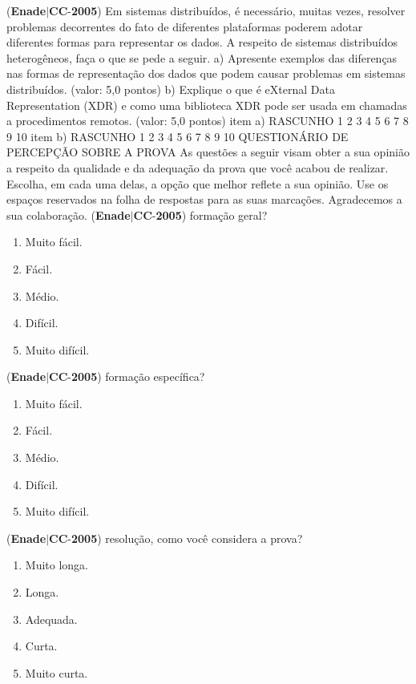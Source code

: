 \documentclass{exam}
\begin{document}
\begin{questions}
\begin{enumerate}[label=\alph*)]
	\end{enumerate}

\question (\textbf{Enade}$|$\textbf{CC}-\textbf{2005}) Em sistemas distribuídos, é necessário, muitas vezes, resolver problemas decorrentes do fato de diferentes plataformas
poderem adotar diferentes formas para representar os dados.
A respeito de sistemas distribuídos heterogêneos, faça o que se pede a seguir.
a) Apresente exemplos das diferenças nas formas de representação dos dados que podem causar problemas em sistemas distribuídos.
(valor: 5,0 pontos)
b) Explique o que é eXternal Data Representation (XDR) e como uma biblioteca XDR pode ser usada em chamadas a procedimentos
remotos. (valor: 5,0 pontos)
item a) RASCUNHO
1
2
3
4
5
6
7
8
9
10
item b) RASCUNHO
1
2
3
4
5
6
7
8
9
10
QUESTIONÁRIO DE PERCEPÇÃO SOBRE A PROVA
As questões a seguir visam obter a sua opinião a respeito da qualidade e da adequação da prova que você acabou
de realizar. Escolha, em cada uma delas, a opção que melhor reflete a sua opinião. Use os espaços reservados na folha
de respostas para as suas marcações.
Agradecemos a sua colaboração.
\question (\textbf{Enade}$|$\textbf{CC}-\textbf{2005}) formação geral?
	\begin{enumerate}[label=\alph*)]
		\item  Muito fácil.
		\item  Fácil.
		\item  Médio.
		\item  Difícil.
		\item  Muito difícil.

	\end{enumerate}

\question (\textbf{Enade}$|$\textbf{CC}-\textbf{2005}) formação específica?
	\begin{enumerate}[label=\alph*)]
		\item  Muito fácil.
		\item  Fácil.
		\item  Médio.
		\item  Difícil.
		\item  Muito difícil.

	\end{enumerate}

\question (\textbf{Enade}$|$\textbf{CC}-\textbf{2005}) resolução, como você considera a prova?
	\begin{enumerate}[label=\alph*)]
		\item  Muito longa.
		\item  Longa.
		\item  Adequada.
		\item  Curta.
		\item  Muito curta.


\end{enumerate}
\end{questions}
\end{document}
